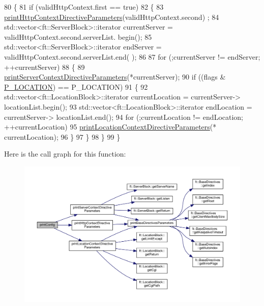\begin{DoxyCode}
80     \{
81         \textcolor{keywordflow}{if} (validHttpContext.first == \textcolor{keyword}{true})
82         \{
83             \hyperlink{classft_1_1_print_config_af912dc88061594effceb350034b7c5d9}{printHttpContextDirectiveParameters}(validHttpContext.second)
      ;
84             std::vector<ft::ServerBlock>::iterator  currentServer = validHttpContext.second.serverList.
      begin();
85             std::vector<ft::ServerBlock>::iterator      endServer = validHttpContext.second.serverList.end(
      );
86 
87             \textcolor{keywordflow}{for} (;currentServer != endServer; ++currentServer)
88             \{
89                 \hyperlink{classft_1_1_print_config_a5f88f0aae9e0678e2637ae329b74739e}{printServerContextDirectiveParameters}(*currentServer);
90                 \textcolor{keywordflow}{if} ((flags & \hyperlink{_print_config_8hpp_aa57280f65c1d8b88de25d67b2353a7dd}{P\_LOCATION}) == P\_LOCATION)
91                 \{
92                     std::vector<ft::LocationBlock>::iterator    currentLocation = currentServer->
      locationList.begin();
93                     std::vector<ft::LocationBlock>::iterator        endLocation = currentServer->
      locationList.end();
94                     \textcolor{keywordflow}{for} (;currentLocation != endLocation; ++currentLocation)
95                         \hyperlink{classft_1_1_print_config_a8862bb68558be4a7286c6ce05db3fa4d}{printLocationContextDirectiveParameters}(*
      currentLocation);
96                 \}
97             \}
98         \}
99     \}
\end{DoxyCode}
Here is the call graph for this function\+:
\nopagebreak
\begin{figure}[H]
\begin{center}
\leavevmode
\includegraphics[width=350pt]{classft_1_1_print_config_a09fbf488251ed5f5079e798b1ce04caf_cgraph}
\end{center}
\end{figure}
